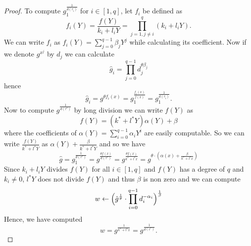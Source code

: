 \begin{proof}
	To compute $g_1^{\frac{1}{d(\tau_i)}}$ for $i \in [1,q]$, let $f_i$ be defined as
	$$f_i(Y) = \frac{f(Y)}{k_i+l_iY} = \prod_{j=1, j \neq i}^q (k_i + l_iY).$$
	We can write $f_i$ as 
	$f_i(Y) = \sum_{j=0}^{q-1} \beta_jY^j$ while calculating its coefficient.  Now if we denote $g^{x^j}$ by $d_j$ we can calculate
	$$\hat{g}_i = \prod_{j=0}^{q-1} d_j^{\theta\beta_j}$$
	hence
	$$\hat{g}_i = g^{\theta f_i(x)} = g_1^{\frac{ f_i(x)}{f(x)}}=   g_1^{\frac{1}{d(\tau_i)}}.$$
	Now to compute $g^\frac{1}{d(\tau^*)}$ by long division we can write $f(Y)$ as 
	$$f(Y) = (k^*+l^*Y)\alpha(Y) + \beta$$
	  where the coefficients of $\alpha(Y) = \sum_{i=0}^{q-1} \alpha_iY^i$ are easily computable. So we can write $\frac{f(Y)}{k^*+l^*Y}$ as $\alpha(Y) + \frac{\beta}{k^*+l^*Y}$ and so we have
	$$\hat{g} = g_1^{\frac{1}{d(\tau^*)}} =g^{\frac{\theta f(x)}{d(\tau^*)}}=g^{\frac{\theta f(x)}{k^* + l^*x}} = g^{\theta\cdot(\alpha(x) + \frac{\beta}{k^*+l^*x})} $$
	Since $k_i +l_iY$ divides $f(Y)$ for all $i\in [1,q]$ and $f(Y)$ has a degree of $q$ and $k_i \neq 0$, $l^*Y$ does not divide $f(Y)$ and thus $\beta$ is non zero and we can compute
	$$w \leftarrow \Big{(} \hat{g}^{\frac{1}{\theta}} \cdot \prod_{i=0}^{q-1} d_i^{-\alpha_i}\Big{)}^{\frac{1}{\beta}}$$
	Hence, we have computed
	$$w  = g^{\frac{1}{k^*+l^*x}} = g^\frac{1}{d(\tau^*)}.$$
	
\end{proof}
